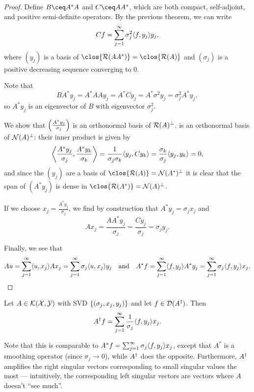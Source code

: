 \begin{proof}
    Define $B \ceq A^*A$ and $C \ceq AA^*$, which are both compact, self-adjoint, and positive semi-definite operators. By the previous theorem, we can write
    \[
     Cf = \sum_{j=1}^\infty \sigma_j^2 \ang{f, y_j} y_j,
    \]
    where $(y_j)$ is a basis of $\clos{\Ran(AA^*)} = \clos{\Ran(A)}$ and $(\sigma_j)$ is a positive decreasing sequence converging to 0.  
    
    Note that
    \[
    B A^* y_j = A^* A A y_j = A^* C y_j = A^* \sigma^2 y_j = \sigma_j^2 A^* y_j,
    \]
    so $A^* y_j$ is an eigenvector of $B$ with eigenvector $\sigma_j^2$. 
    
    We show that $\qty(\frac{A^* y_j}{\sigma_j})$ is an orthonormal basis of $\Ran(A)\P$. is an orthonormal basis of $\Nul(A)\P$: their inner product is given by 
    \[
    \ang*{\frac{A^* y_j}{\sigma_j}, \frac{A^* y_k}{\sigma_k}} = \frac{1}{\sigma_j\sigma_k} \ang{y_j, C y_k} = \frac{\sigma_k}{\sigma_j} \ang{y_j, y_k} = 0, 
    \]
    and since the $(y_j)$ are a basis of $\clos{\Ran(A)} = \Nul(A^*)\P$ it is clear that the span of $(A^* y_j)$ is dense in $\clos{\Ran(A^*)} = \Nul(A)\P$. 
    
    If we choose $x_j = \frac{A^* y_j}{\sigma_j}$, we find by construction that $A^* y_j = \sigma_j x_j$ and 
    \[
    A x_j = \frac{AA^* y_j}{\sigma_j} = \frac{C y_j}{\sigma_j} = \sigma_j y_j.
    \]
    
    Finally, we see that
    \[
    A u = \sum_{j=1}^\infty  \ang{u, x_j} Ax_j = \sum_{j=1}^\infty \sigma_j \ang{u, x_j} y_j \quad\text{and}\quad A^* f = \sum_{j=1}^\infty \ang{f, y_j} A^* y_j = \sum_{j=1}^\infty \sigma_j \ang{f, y_j} x_j. 
    \]
\end{proof}

\begin{theorem}
    Let $A \in \KKK(\XXX, \YYY)$ with SVD $\qty{(\sigma_j, x_j, y_j)}$ and let $f \in \Dom(A\D)$. Then
    \[
    A\D f = \sum_{j=1}^\infty \frac{1}{\sigma_j} \ang{f, y_j} x_j.
    \]
\end{theorem}

\begin{remark}
    Note that this is comparable to $A^* f = \sum_{j=1}^\infty \sigma_j \ang{f, y_j} x_j$, except that $A^*$ is a smoothing operator (since $\sigma_j \to 0$), while $A\D$ does the opposite. Furthermore, $A\D$ amplifies the right singular vectors corresponding to small singular values the most --- intuitively, the corresponding left singular vectors are vectors where $A$ doesn't ``see much''. 
\end{remark}

